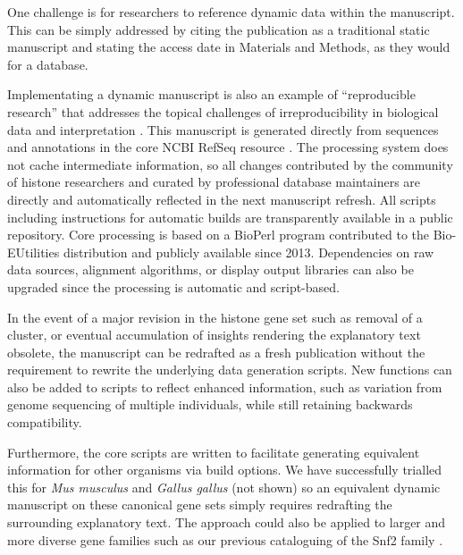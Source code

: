   One challenge is for researchers to reference dynamic data within the manuscript.
  This can be simply addressed by citing the publication as a traditional static manuscript
  and stating the access date in Materials and Methods, as they would for a database.

  Implementating a dynamic manuscript is also an example of ``reproducible research''
  \citep{reproducible-research-bioinformatics,reproducible-research-law}
  that addresses the topical challenges of irreproducibility in biological data
  and interpretation \citep{ErrorProne2012,OpenPrograms2012}.
  This manuscript is generated directly from sequences and annotations
  in the core NCBI RefSeq resource \citep{PruittRefseq2014}.
  The processing system does not cache intermediate information,
  so all changes contributed by the community of histone researchers
  and curated by professional database maintainers
  are directly and automatically reflected in the next manuscript refresh.
  All scripts including instructions for automatic builds
  are transparently available in a public repository.
  Core processing is based on a BioPerl program contributed to the Bio-EUtilities distribution
  and publicly available since 2013.
  Dependencies on raw data sources, alignment algorithms, or display output libraries
  can also be upgraded since the processing is automatic and script-based.

  In the event of a major revision in the histone gene set such as removal of a cluster,
  or eventual accumulation of insights rendering the explanatory text obsolete,
  the manuscript can be redrafted as a fresh publication
  without the requirement to rewrite the underlying data generation scripts.
  New functions can also be added to scripts to reflect enhanced information,
  such as variation from genome sequencing of multiple individuals,
  while still retaining backwards compatibility.

  Furthermore, the core scripts are written to facilitate generating
  equivalent information for other organisms via build options.
  We have successfully trialled this for \textit{Mus musculus}
  and \textit{Gallus gallus} (not shown)
  so an equivalent dynamic manuscript on these canonical gene sets
  simply requires redrafting the surrounding explanatory text.
  The approach could also be applied to larger and more diverse gene families such as
  our previous cataloguing of the Snf2 family \citep{andrew-snf2-catalogue}.
